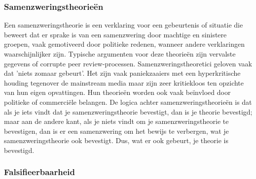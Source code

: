 \documentclass[../summary.tex]{subfiles}
\begin{document}
	\subsubsection{Samenzweringstheorieën}
	
	Een samenzweringstheorie is een verklaring voor een gebeurtenis of situatie die beweert dat er sprake is van een samenzwering door machtige en sinistere groepen, vaak gemotiveerd door politieke redenen, wanneer andere verklaringen waarschijnlijker zijn. Typische argumenten voor deze theorieën zijn vervalste gegevens of corrupte peer review-processen. Samenzweringstheoretici geloven vaak dat 'niets zomaar gebeurt'. Het zijn vaak paniekzaaiers met een hyperkritische houding tegenover de mainstream media maar zijn zeer kritiekloos ten opzichte van hun eigen opvattingen. Hun theorieën worden ook vaak beïnvloed door politieke of commerciële belangen. De logica achter samenzweringstheorieën is dat als je iets vindt dat je samenzweringstheorie bevestigt, dan is je theorie bevestigd; maar aan de andere kant, als je niets vindt om je samenzweringstheorie te bevestigen, dan is er een samenzwering om het bewijs te verbergen, wat je samenzweringstheorie ook bevestigt. Dus, wat er ook gebeurt, je theorie is bevestigd.
	
	\subsubsection{Falsifieerbaarheid}
	
\end{document}
